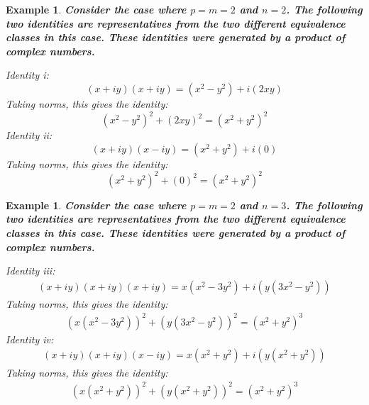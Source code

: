 \documentclass[12pt]{article}
\newtheorem{example}[theorem]{Example}
\numberwithin{equation}{section}
\begin{document}
\begin{landscape}
{{\begin{example}
\bf
Consider the case where \( p = m = 2 \) and \( n = 2\).
The following two identities are representatives from 
the two different equivalence classes in this case. These identities
were generated by a product of complex numbers. 

\noindent
Identity i:
\begin{equation*}
(x + iy)(x + iy) = (x^2 - y^2 ) + i(2xy) 
\end{equation*}
Taking norms, this gives the identity:
\begin{equation*}
    (x^2 - y^2 )^2 + (2xy)^2 
    = (x^2 + y^2)^2
\end{equation*}
Identity ii:
\begin{equation*}
    (x + iy )(x - iy )
    = (x^2 + y^2 ) + i(0)  
\end{equation*}
Taking norms, this gives the identity:
\begin{equation*}
    (x^2 + y^2 )^2 + (0)^2
    = (x^2 + y^2 )^2
\end{equation*}
\end{example}



\begin{example}
\bf
Consider the case where \( p = m = 2 \) and \( n = 3\).
The following two identities are representatives from 
the two different equivalence classes in this case. These identities
were generated by a product of complex numbers. 

\noindent
Identity iii:
\begin{align*}
    (x + iy)(x + iy)(x + iy) 
    = x(x^2 - 3y^2) + i(  y(3x^2 - y^2) )  
    \end{align*}
Taking norms, this gives the identity:
    \begin{align*}
    (x(x^2 - 3y^2))^2 + (  y(3x^2 - y^2) )^2  
    = (x^2 + y^2)^3
    \end{align*}
Identity iv:
    \begin{align*}
    (x + iy )(x + iy)(x - iy ) 
    = x(x^2 + y^2 ) + i(y(x^2 + y^2))  
    \end{align*}
Taking norms, this gives the identity:
    \begin{align*}
    ( x(x^2 + y^2) )^2 + ( y(x^2 + y^2) )^2 
    = (x^2 + y^2 )^3
    \end{align*}
\end{example}














}}
\end{landscape}
\end{document}

